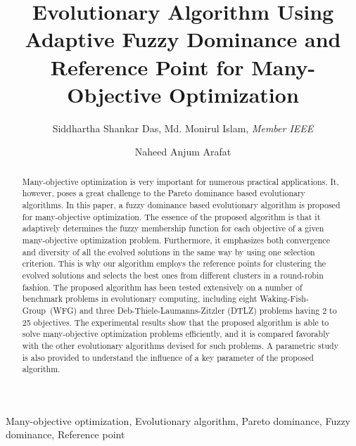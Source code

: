 \documentclass[review]{elsarticle}
\begin{document}
\begin{frontmatter}

\title{Evolutionary Algorithm Using Adaptive Fuzzy Dominance and Reference Point for Many-Objective Optimization}

\author{Siddhartha Shankar Das, Md. Monirul Islam, \textit{Member IEEE}%
}
\address{Department of Computer Science and Engineering, Bangladesh University of Engineering And Technology (BUET), Dhaka Bangladesh}

\author{Naheed Anjum Arafat}
\address{School of Computing, National University of Singapore~(NUS), Singapore}


%
%

\begin{abstract}
Many-objective optimization is very important for numerous practical applications. It, however,  poses a great challenge to the Pareto dominance based  evolutionary algorithms. In this paper, a fuzzy dominance based evolutionary algorithm is proposed for many-objective optimization.  The essence of the proposed algorithm is that it adaptively determines the fuzzy membership function for each objective of a given many-objective optimization problem. Furthermore, it emphasizes both convergence and diversity of all the evolved solutions in the same way by using one selection criterion. This is why  our algorithm employs the reference points for clustering the evolved solutions and selects the best ones from different clusters in a round-robin fashion. The proposed algorithm has been tested extensively on a number of benchmark problems in evolutionary computing, including eight Waking-Fish-Group~(WFG)  and three Deb-Thiele-Laumanns-Zitzler (DTLZ) problems having 2 to 25 objectives. The experimental results show that the proposed algorithm is able to solve many-objective optimization problems efficiently, and it is compared favorably with the other evolutionary algorithms devised for such problems. A parametric study is also provided to understand the influence of a key parameter of the proposed algorithm.
\end{abstract}

\begin{keyword}
Many-objective optimization, Evolutionary algorithm, Pareto dominance, Fuzzy dominance, Reference point
\end{keyword}

\end{frontmatter}
\end{document}

